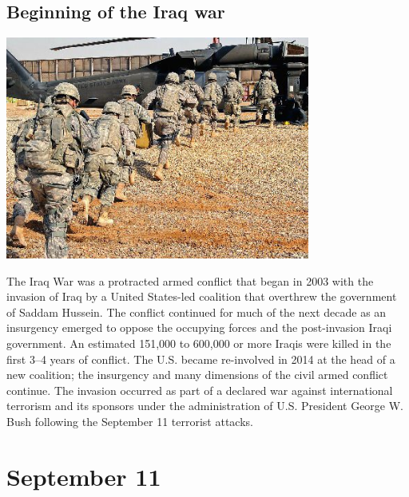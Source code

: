\documentclass[11pt]{report}
\begin{document}
\subsection{Beginning of the Iraq war}
\vspace{2mm}\begin{center}\includegraphics[width=10cm]{./img/iraqWar.jpg}\end{center}
The Iraq War was a protracted armed conflict that began in 2003 with the invasion of Iraq by a United States-led coalition that overthrew the government of Saddam Hussein. The conflict continued for much of the next decade as an insurgency emerged to oppose the occupying forces and the post-invasion Iraqi government. An estimated 151,000 to 600,000 or more Iraqis were killed in the first 3–4 years of conflict. The U.S. became re-involved in 2014 at the head of a new coalition; the insurgency and many dimensions of the civil armed conflict continue. The invasion occurred as part of a declared war against international terrorism and its sponsors under the administration of U.S. President George W. Bush following the September 11 terrorist attacks.

\section{September 11}
\end{document}
